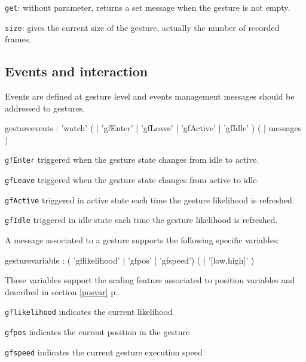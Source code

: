 \documentclass[a4paper,twoside]{report}
\newcommand{\subsublevel}[1]	{\subsection{#1}}
\newcommand{\fullref}[1]	{\ref{#1} p.\pageref{#1}}
\newcommand{\OSC}[1]		{\texttt{#1}}
\let\olditemize\itemize
\let\oldenditemize\enditemize
\renewenvironment{itemize} 	{\olditemize \setlength{\itemsep}{1mm}}{\oldenditemize}
\begin{document}
\begin{itemize}
\item \OSC{get}: without parameter, returns a set message when the gesture is not empty.
\item \OSC{size}: gives the current size of the gesture, actually the number of recorded frames. 
\end{itemize}


\subsublevel{Events and interaction}\label{gfevents}

Events are defined at gesture level and events management messages should be addressed to gestures. 

\begin{rail}
gestureevents :
		  	'watch' ( | 'gfEnter' | 'gfLeave' | 'gfActive' | 'gfIdle' )  (  |  messages )
\end{rail}

\begin{itemize}
\item \OSC{gfEnter} triggered when the gesture state changes from idle to active.
\item \OSC{gfLeave} triggered when the gesture state changes from active to idle.
\item \OSC{gfActive} triggered in active state each time the gesture likelihood is refreshed.
\item \OSC{gfIdle} triggered in idle state each time the gesture likelihood is refreshed.
\end{itemize}

A message associated to a gesture supports the following specific variables:
\begin{rail}
gesturevariable : 
		( 'gflikelihood'
		| 'gfpos'
		| 'gfspeed') ( | '[low,high]' ) 
\end{rail}
These variables support the scaling feature associated to position variables and described in section \fullref{posvar}.
\begin{itemize}
\item \OSC{gflikelihood} indicates the current likelihood 
\item \OSC{gfpos} indicates the current position in the gesture 
\item \OSC{gfspeed} indicates the current gesture execution speed 
\end{itemize}
\end{document}
